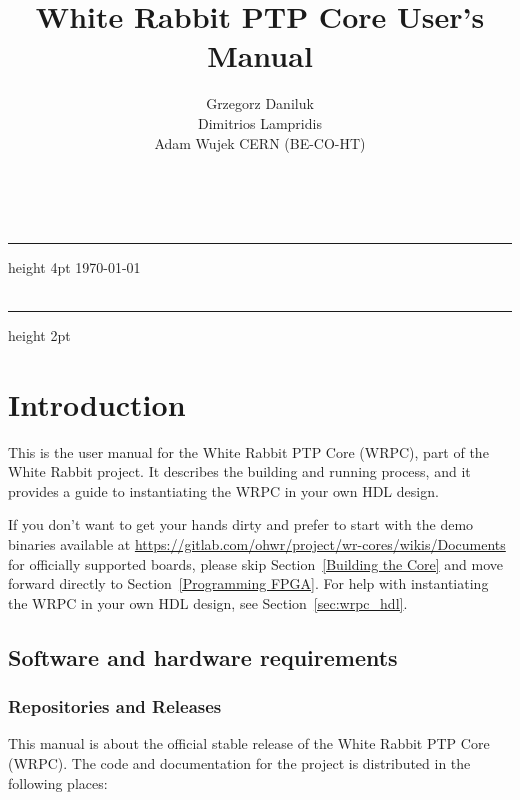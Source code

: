 \documentclass[a4paper, 12pt]{article}
\title{White Rabbit PTP Core User's Manual}
\author{Grzegorz Daniluk \\Dimitrios Lampridis \\Adam Wujek \hfill CERN (BE-CO-HT)}
\renewcommand{\_}{\underscore\allowbreak}
\begin{document}


\makeatletter
{}
\raggedright
{\LARGE\bf\@title}\\[0.2 cm]
\hrule height 4pt \vspace{0.1cm}
{\large\gitrevinfo\hfill\today}\\
\vspace*{\fill}
{\large\@author}\\
\hrule height 2pt
\justify
\makeatother

\newpage

\tableofcontents

\newpage

\section{Introduction}

This is the user manual for the White Rabbit PTP Core (WRPC), part of the White
Rabbit project. It describes the building and running process, and it provides a
guide to instantiating the WRPC in your own HDL design.

If you don't want to get your hands dirty and prefer to start with the demo binaries
available at \url{https://gitlab.com/ohwr/project/wr-cores/wikis/Documents} for officially
supported boards, please skip Section~\ref{Building the Core} and move forward
directly to Section~\ref{Programming FPGA}. For help with instantiating the WRPC in
your own HDL design, see Section~\ref{sec:wrpc_hdl}.


\subsection{Software and hardware requirements}
\label{Software and hardware requirements}

\subsubsection{Repositories and Releases}
\label{Repositories and Releases}

This manual is about the official \gitrevinfo{} stable release of the White
Rabbit PTP Core (WRPC).  The code and documentation for the project is
distributed in the following places:
\end{document}
